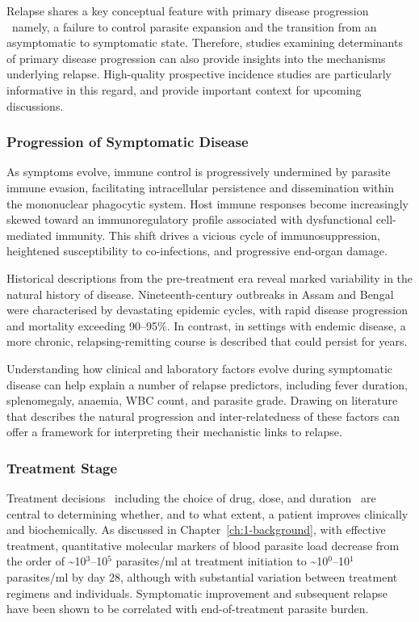 Relapse shares a key conceptual feature with primary disease progression \textemdash\ namely, a failure to control parasite expansion and the transition from an asymptomatic to symptomatic state. Therefore, studies examining determinants of primary disease progression can also provide insights into the mechanisms underlying relapse. High-quality prospective incidence studies are particularly informative in this regard, and provide important context for upcoming discussions\cite{picado2010,hasker2014,bern2007}.

\subsubsection{Progression of Symptomatic Disease}

As symptoms evolve, immune control is progressively undermined by parasite immune evasion, facilitating intracellular persistence and dissemination within the mononuclear phagocytic system. Host immune responses become increasingly skewed toward an immunoregulatory profile associated with dysfunctional cell-mediated immunity. This shift drives a vicious cycle of immunosuppression, heightened susceptibility to co-infections, and progressive end-organ damage\cite{kaye2011,costa2023}.

Historical descriptions from the pre-treatment era reveal marked variability in the natural history of disease. Nineteenth-century outbreaks in Assam and Bengal were characterised by devastating epidemic cycles, with rapid disease progression and mortality exceeding 90--95\%\cite{sengupta1947,gibson1983}. In contrast, in settings with endemic disease, a more chronic, relapsing-remitting course is described that could persist for years\cite{sengupta1947}.

Understanding how clinical and laboratory factors evolve during symptomatic disease can help explain a number of relapse predictors, including fever duration, splenomegaly, anaemia, WBC count, and parasite grade. Drawing on literature that describes the natural progression and inter-relatedness of these factors can offer a framework for interpreting their mechanistic links to relapse.

\subsubsection{Treatment Stage}

Treatment decisions \textemdash\ including the choice of drug, dose, and duration \textemdash\ are central to determining whether, and to what extent, a patient improves clinically and biochemically. As discussed in Chapter~\ref{ch:1-background}, with effective treatment, quantitative molecular markers of blood parasite load decrease from the order of \textasciitilde 10$^3$--10$^5$ parasites/ml at treatment initiation to \textasciitilde 10$^0$--10$^1$ parasites/ml by day 28, although with substantial variation between treatment regimens and individuals. Symptomatic improvement and subsequent relapse have been shown to be correlated with end-of-treatment parasite burden\cite{sudarshan2011,verrest2021,verrest2024,takele2023}.

